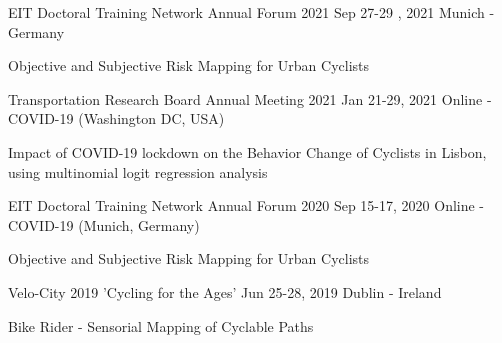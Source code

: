 \begin{cventries}

  \cventrypresentation
    {EIT Doctoral Training Network Annual Forum 2021} %
    {Sep 27-29 , 2021} %
    {Munich - Germany} %
    {
      \begin{cvpresentationitems} %
        \item {} {Objective and Subjective Risk Mapping for Urban Cyclists}
      \end{cvpresentationitems}
    }


  \cventrypresentation
    {Transportation Research Board Annual Meeting 2021} %
    {Jan 21-29, 2021} %
    {Online - COVID-19 (Washington DC, USA)} %
    {
      \begin{cvpresentationitems} %
        \item {} {Impact of COVID-19 lockdown on the Behavior Change of Cyclists in Lisbon, using multinomial logit regression analysis}
      \end{cvpresentationitems}
    }


  \cventrypresentation
    {EIT Doctoral Training Network Annual Forum 2020} %
    {Sep 15-17, 2020} %
    {Online - COVID-19 (Munich, Germany)} %
    {
      \begin{cvpresentationitems} %
        \item {} {Objective and Subjective Risk Mapping for Urban Cyclists}
      \end{cvpresentationitems}
    }


  \cventrypresentation
    {Velo-City 2019 'Cycling for the Ages'} %
    {Jun 25-28, 2019} %
    {Dublin - Ireland} %
    {
      \begin{cvpresentationitems} %
        \item {} {Bike Rider - Sensorial Mapping of Cyclable Paths}
      \end{cvpresentationitems}
    }


\end{cventries}

